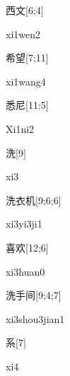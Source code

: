 \begin{verbete}[xi1wen2]{西文}[6;4]
\begin{pronuncia}{xi1wen2}
\end{pronuncia}
\end{verbete}

\begin{verbete}[xi1wang4]{希望}[7;11]
\begin{pronuncia}{xi1wang4}
\end{pronuncia}
\end{verbete}

\begin{verbete}[Xi1ni2]{悉尼}[11;5]
\begin{pronuncia}{Xi1ni2}
\end{pronuncia}
\end{verbete}

\begin{verbete}[xi3]{洗}[9]
\begin{pronuncia}{xi3}
\end{pronuncia}
\end{verbete}

\begin{verbete}[xi3yi3ji1]{洗衣机}[9;6;6]
\begin{pronuncia}{xi3yi3ji1}
\end{pronuncia}
\end{verbete}

\begin{verbete}[xi3huan0]{喜欢}[12;6]
\begin{pronuncia}{xi3huan0}
\end{pronuncia}
\end{verbete}

\begin{verbete}{洗手间}[9;4;7]
\begin{pronuncia}{xi3shou3jian1}
\end{pronuncia}
\end{verbete}

\begin{verbete}[xi4]{系}[7]
\begin{pronuncia}{xi4}
\end{pronuncia}
\end{verbete}

